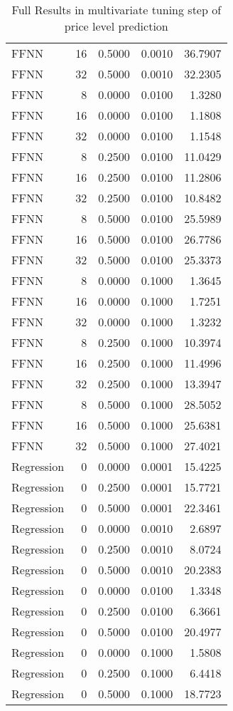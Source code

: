 \begin{table}[h!]
\begin{adjustbox}{max width=\textwidth}
\begin{tabular}{lrrrr}
  FFNN &    16 & 0.5000 & 0.0010 & 36.7907 \\ 
  FFNN &    32 & 0.5000 & 0.0010 & 32.2305 \\ 
  FFNN &     8 & 0.0000 & 0.0100 & 1.3280 \\ 
  FFNN &    16 & 0.0000 & 0.0100 & 1.1808 \\ 
  FFNN &    32 & 0.0000 & 0.0100 & 1.1548 \\ 
  FFNN &     8 & 0.2500 & 0.0100 & 11.0429 \\ 
  FFNN &    16 & 0.2500 & 0.0100 & 11.2806 \\ 
  FFNN &    32 & 0.2500 & 0.0100 & 10.8482 \\ 
  FFNN &     8 & 0.5000 & 0.0100 & 25.5989 \\ 
  FFNN &    16 & 0.5000 & 0.0100 & 26.7786 \\ 
  FFNN &    32 & 0.5000 & 0.0100 & 25.3373 \\ 
  FFNN &     8 & 0.0000 & 0.1000 & 1.3645 \\ 
  FFNN &    16 & 0.0000 & 0.1000 & 1.7251 \\ 
  FFNN &    32 & 0.0000 & 0.1000 & 1.3232 \\ 
  FFNN &     8 & 0.2500 & 0.1000 & 10.3974 \\ 
  FFNN &    16 & 0.2500 & 0.1000 & 11.4996 \\ 
  FFNN &    32 & 0.2500 & 0.1000 & 13.3947 \\ 
  FFNN &     8 & 0.5000 & 0.1000 & 28.5052 \\ 
  FFNN &    16 & 0.5000 & 0.1000 & 25.6381 \\ 
  FFNN &    32 & 0.5000 & 0.1000 & 27.4021 \\ 
  Regression &     0 & 0.0000 & 0.0001 & 15.4225 \\ 
  Regression &     0 & 0.2500 & 0.0001 & 15.7721 \\ 
  Regression &     0 & 0.5000 & 0.0001 & 22.3461 \\ 
  Regression &     0 & 0.0000 & 0.0010 & 2.6897 \\ 
  Regression &     0 & 0.2500 & 0.0010 & 8.0724 \\ 
  Regression &     0 & 0.5000 & 0.0010 & 20.2383 \\ 
  Regression &     0 & 0.0000 & 0.0100 & 1.3348 \\ 
  Regression &     0 & 0.2500 & 0.0100 & 6.3661 \\ 
  Regression &     0 & 0.5000 & 0.0100 & 20.4977 \\ 
  Regression &     0 & 0.0000 & 0.1000 & 1.5808 \\ 
  Regression &     0 & 0.2500 & 0.1000 & 6.4418 \\ 
  Regression &     0 & 0.5000 & 0.1000 & 18.7723 \\ 
   \hline
 \end{tabular}
\end{adjustbox}
\caption{Full Results in multivariate tuning step of price level prediction} 
\label{tab:level.multivar.par.tuning.full}
\end{table}

